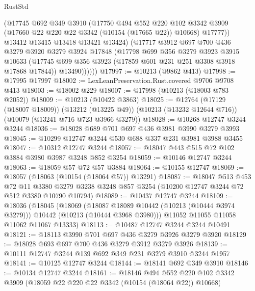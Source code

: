 \begin{lexlean}{RustStd}
\begin{coremodule}
              (@17745
                @692
                @349
                @3910
                (@17750
                  @494
                  @552
                  @220
                  @102
                  @3342
                  @3909
                  (@17660 @22 @220 @22 @3342 (@10154 (@17665 @22)) @10668)
                  @17777))
              @13412
              @13415
              @13418
              @13421
              @13424)
            (@17717
              @3912
              @697
              @700
              @436
              @3279
              @3920
              @3279
              @3924
              @17848
              (@17798
                @699
                @356
                @3279
                @3923
                @3915
                @10633
                (@17745 @699 @356 @3923 (@17859 @601 @231 @251 @3308 @3918 @17868 @17844))
                @13490))))))
@17997 := @10213 (@9862 @413)
@17998 := @17995 @17997
@18002 := LexLeanPreservation.Rust.covered @9706 @9708 @413
@18003 := @18002 @229
@18007 := @17998 (@10213 (@18003 @783 @2052))
@18009 := @10213 (@10422 @3863)
@18025 := @12764
    (@17129 (@18007 @18009))
    (@13212 (@13225 @49))
    (@10213 (@13232 @12644 @716))
    (@10079 (@13241 @716 @723 @3966 @3279))
@18028 := @10268 @12747 @3244 @3244
@18036 := @18028 @689 @701 @697 @436 @3981 @3990 @3279 @3993
@18045 := @10299 @12747 @3244 @530 @688 @337 @231 @3981 @3988 @3455
@18047 := @10312 @12747 @3244
@18057 := @18047 @443 @515 @72 @102 @3884 @3980 @3987 @3248 @852 @3254
@18059 := @10146 @12747 @3244
@18063 := @18059 @57 @72 @57 @3884
@18064 := @10155 @12747
@18069 := @18057 (@18063 (@10154 (@18064 @57)) @13291)
@18087 := @18047
    @513
    @453
    @72
    @11
    @3380
    @3279
    @3238
    @3248
    @857
    @3254
    (@10200 @12747 @3244 @72 @512 @3380 @10790 @10794)
@18089 := @10437 @12747 @3244
@18109 := @18036
    (@18045
      (@18069
        (@18087 @18089 @10442 (@10213 (@10444 @3974 @3279)))
        @10442
        (@10213 (@10444 @3968 @3980)))
      @11052
      @11055
      @11058
      @11062
      @11067
      @13333)
@18113 := @10487 @12747 @3244 @3244 @10491
@18121 := @18113 @3990 @701 @697 @436 @3279 @3926 @3279 @3920
@18129 := @18028 @693 @697 @700 @436 @3279 @3912 @3279 @3926
@18139 := @10111 @12747 @3244 @139 @692 @349 @231 @3279 @3910 @3244 @1957
@18141 := @10125 @12747 @3244
@18144 := @18141 @692 @349 @3910
@18146 := @10134 @12747 @3244
@18161 := @18146
    @494
    @552
    @220
    @102
    @3342
    @3909
    (@18059 @22 @220 @22 @3342 (@10154 (@18064 @22)) @10668)

\end{coremodule}
\end{lexlean}
